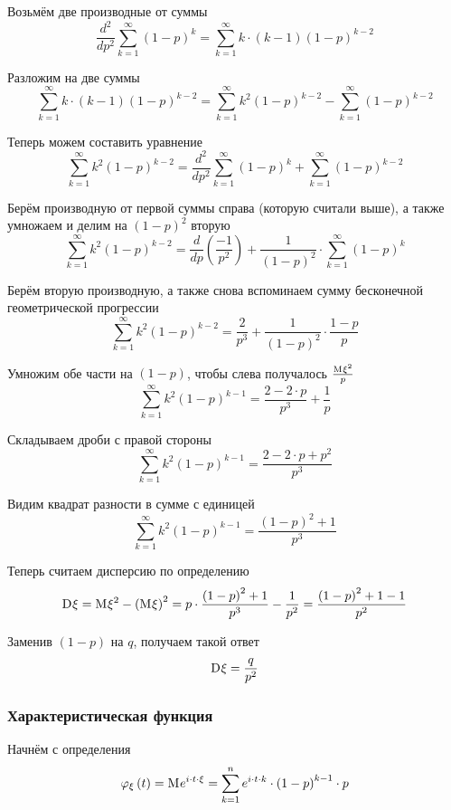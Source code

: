 Возьмём две производные от суммы
$$\frac{d^2}{dp^2} \sum_{k=1}^\infty \left( 1-p \right)^k
    = \sum_{k=1}^\infty k \cdot \left( k-1 \right) \left( 1-p \right)^{k-2}$$

Разложим на две суммы
$$\sum_{k=1}^\infty k \cdot \left( k-1 \right) \left( 1-p \right)^{k-2}
    = \sum_{k=1}^\infty k^2 \left( 1-p \right)^{k-2}
        - \sum_{k=1}^\infty \left( 1-p \right)^{k-2}$$

Теперь можем составить уравнение
$$\sum_{k=1}^\infty k^2 \left( 1-p \right)^{k-2} =
    \frac{d^2}{dp^2} \sum_{k=1}^\infty \left( 1-p \right)^k
        + \sum_{k=1}^\infty \left( 1-p \right)^{k-2}$$

Берём производную от первой суммы справа (которую считали выше),
а также умножаем и делим на $\left( 1-p \right)^2$ вторую
$$\sum_{k=1}^\infty k^2 \left( 1-p \right)^{k-2} =
    \frac{d}{dp} \left( \frac{-1}{p^2} \right)
        + \frac{1}{\left( 1-p \right)^2}
        \cdot \sum_{k=1}^\infty \left( 1-p \right)^k$$

Берём вторую производную, а также снова вспоминаем
сумму бесконечной геометрической прогрессии
$$\sum_{k=1}^\infty k^2 \left( 1-p \right)^{k-2} =
    \frac{2}{p^3} + \frac{1}{\left( 1-p \right)^2} \cdot \frac{1-p}{p}$$

Умножим обе части на $\left( 1-p \right)$,
чтобы слева получалось $\frac{\mathrm{M}_{} \xi^2}{p}$
$$\sum_{k=1}^\infty k^2 \left( 1-p \right)^{k-1} =
    \frac{2 - 2 \cdot p}{p^3} + \frac{1}{p}$$

Складываем дроби с правой стороны
$$\sum_{k=1}^\infty k^2 \left( 1-p \right)^{k-1} =
    \frac{2 - 2 \cdot p + p^2}{p^3}$$

Видим квадрат разности в сумме с единицей
$$\sum_{k=1}^\infty k^2 \left( 1-p \right)^{k-1} =
    \frac{\left( 1-p \right)^2 + 1}{p^3}$$

Теперь считаем дисперсию по определению
$$\mathrm{D}_{} \xi
    = \mathrm{M}_{} \xi^2 - \left( \mathrm{M}_{} \xi \right)^2
    = p \cdot \frac{\left( 1-p \right)^2 + 1}{p^3} - \frac{1}{p^2}
    = \frac{\left( 1-p \right)^2 + 1 - 1}{p^2}$$

Заменив $\left( 1-p \right)$ на $q$, получаем такой ответ
$$\mathrm{D}_{} \xi = \frac{q}{p^2}$$

\subsubsection{Характеристическая функция}
Начнём с определения
$$\varphi_{\xi}\left( t \right)
    = \mathrm{M}_{} e^{i \cdot t \cdot \xi}
    = \sum_{k=1}^n e^{i \cdot t \cdot k}
        \cdot \left( 1-p \right)^{k-1} \cdot p$$

